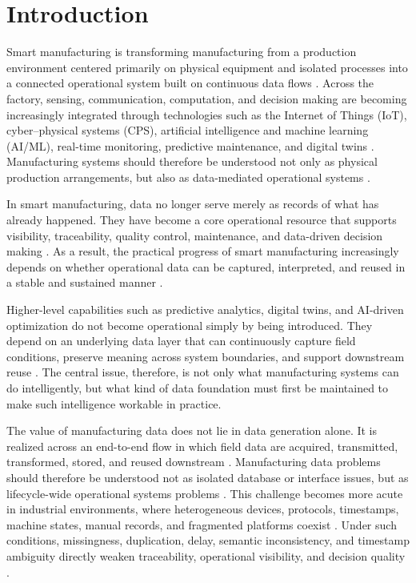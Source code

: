 \documentclass[systems,article,submit,pdftex,moreauthors]{Definitions/mdpi}
\begin{document}
\section{Introduction}
\label{sec:introduction}

Smart manufacturing is transforming manufacturing from a production environment centered primarily on physical equipment and isolated processes into a connected operational system built on continuous data flows \cite{song2025smart,tao2018datadriven}. Across the factory, sensing, communication, computation, and decision making are becoming increasingly integrated through technologies such as the Internet of Things (IoT), cyber--physical systems (CPS), artificial intelligence and machine learning (AI/ML), real-time monitoring, predictive maintenance, and digital twins \cite{tao2017digital,ding2019digital,nguyen2025aidriven}. Manufacturing systems should therefore be understood not only as physical production arrangements, but also as data-mediated operational systems \cite{cerquitelli2021manufacturing}.

In smart manufacturing, data no longer serve merely as records of what has already happened. They have become a core operational resource that supports visibility, traceability, quality control, maintenance, and data-driven decision making \cite{ren2019bigdata,tao2018datadriven}. As a result, the practical progress  of smart manufacturing increasingly depends on whether operational data can be captured, interpreted, and reused in a stable and sustained manner \cite{bernstein2018contextualising}.

Higher-level capabilities such as predictive analytics, digital twins, and AI-driven optimization do not become operational simply by being introduced. They depend on an underlying data layer that can continuously capture field conditions, preserve meaning across system boundaries, and support downstream reuse \cite{walton2024unified,zaborowski2024role}. The central issue, therefore, is not only what manufacturing systems can do intelligently, but what kind of data foundation must first be maintained to make such intelligence workable in practice.

The value of manufacturing data does not lie in data generation alone. It is realized across an end-to-end flow in which field data are acquired, transmitted, transformed, stored, and reused downstream \cite{ismail2019manufacturing,raptis2019data}. Manufacturing data problems should therefore be understood not as isolated database or interface issues, but as lifecycle-wide operational systems problems \cite{hedberg2017lift}. This challenge becomes more acute in industrial environments, where heterogeneous devices, protocols, timestamps, machine states, manual records, and fragmented platforms coexist \cite{zeid2019interoperability,pereira2021towards}. Under such conditions, missingness, duplication, delay, semantic inconsistency, and timestamp ambiguity directly weaken traceability, operational visibility, and decision quality \cite{morris2020foundations,foidl2024pipeline}.
\end{document}
